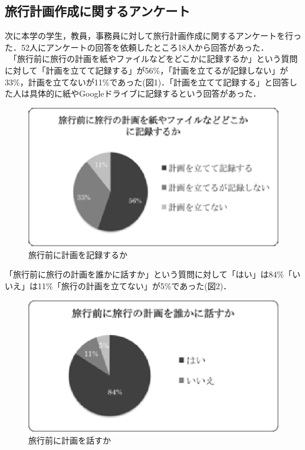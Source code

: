 \documentclass{funthesis}
\begin{document}
\subsection{旅行計画作成に関するアンケート}
次に本学の学生，教員，事務員に対して旅行計画作成に関するアンケートを行った．52人にアンケートの回答を依頼したところ18人から回答があった．\\
　「旅行前に旅行の計画を紙やファイルなどをどこかに記録するか」という質問に対して「計画を立てて記録する」が56\%，「計画を立てるが記録しない」が33\%，計画を立てないが11\%であった(図1)．「計画を立てて記録する」と回答した人は具体的に紙やGoogleドライブに記録するという回答があった．
\begin{figure}[htpb]
\begin{center}
\includegraphics[scale=1.0]{filerecord.eps}
\caption{旅行前に計画を記録するか}
\end{center}
\end{figure}

「旅行前に旅行の計画を誰かに話すか」という質問に対して「はい」は84\%「いいえ」は11\%「旅行の計画を立てない」が5\%であった(図2)．\\
\begin{figure}[htpb]
\begin{center}
\includegraphics[scale=1.0]{beforetalktrip.eps}
\caption{旅行前に計画を話すか}
\end{center}
\end{figure}
\end{document}
